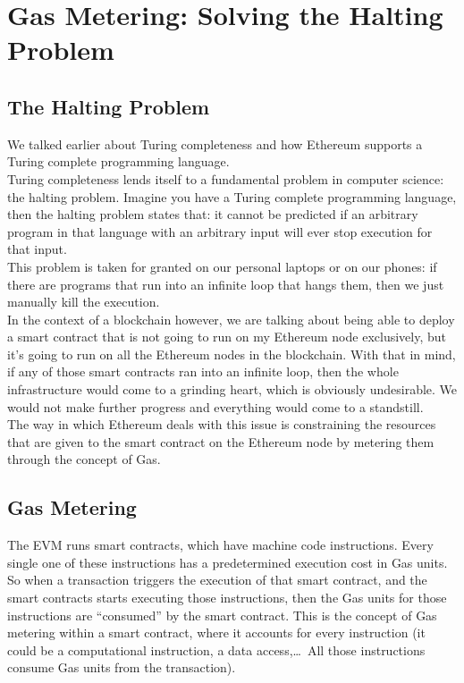 \section{Gas Metering: Solving the Halting Problem}

\subsection*{The Halting Problem}

We talked earlier about Turing completeness and how Ethereum supports a Turing complete programming language.\\

Turing completeness lends itself to a fundamental problem in computer science: the halting problem.
Imagine you have a Turing complete programming language, then the halting problem states that: it cannot be predicted if an arbitrary program in that language with an arbitrary input will ever stop execution for that input.\\

This problem is taken for granted on our personal laptops or on our phones: if there are programs that run into an infinite loop that hangs them, then we just manually kill the execution.\\

In the context of a blockchain however, we are talking about being able to deploy a smart contract that is not going to run on my Ethereum node exclusively, but it's going to run on all the Ethereum nodes in the blockchain.
With that in mind, if any of those smart contracts ran into an infinite loop, then the whole infrastructure would come to a grinding heart, which is obviously undesirable.
We would not make further progress and everything would come to a standstill.\\

The way in which Ethereum deals with this issue is constraining the resources that are given to the smart contract on the Ethereum node by metering them through the concept of Gas.

\subsection*{Gas Metering}

The EVM runs smart contracts, which have machine code instructions.
Every single one of these instructions has a predetermined execution cost in Gas units.
So when a transaction triggers the execution of that smart contract, and the smart contracts starts executing those instructions, then the Gas units for those instructions are ``consumed'' by the smart contract.
This is the concept of Gas metering within a smart contract, where it accounts for every instruction (it could be a computational instruction, a data access,\dots\, All those instructions consume Gas units from the transaction).\\

